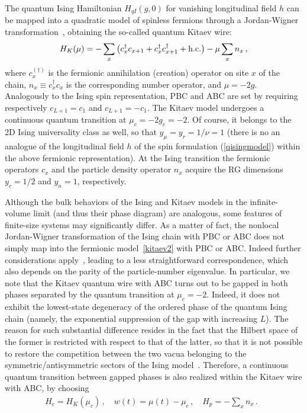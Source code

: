 The quantum Ising Hamiltonian $H_{qI}(g,0)$ for vanishing longitudinal
field $h$ can be mapped into a quadratic model of spinless fermions
through a Jordan-Wigner transformation~\cite{LSM-61, Katsura-62},
obtaining the so-called quantum Kitaev wire:~\cite{Kitaev-2001}
\begin{equation}
  H_{K}(\mu) = - \sum_{x} \big( c_x^\dagger c_{x+1} + c_x^\dagger
  c_{x+1}^\dagger + {\rm h.c.}  \big) - \mu \sum_{x} n_x \,,
  \label{kitaev2}
\end{equation}
where $c_x^{(\dagger)}$ is the fermionic annihilation (creation)
operator on site $x$ of the chain, $n_x\equiv c_x^\dagger c_x$ is the
corresponding number operator, and $\mu=-2g$.  Analogously to the
Ising spin representation, PBC and ABC are set by requiring
respectively $c_{L+1} = c_1$ and $c_{L+1} = -c_1$.  The Kitaev model
undergoes a continuous quantum transition at $\mu_c = -2g_c = -2$.  Of
course, it belongs to the 2D Ising universality class as well, so that
$y_\mu= y_r = 1/\nu=1$ (there is no an analogue of the longitudinal
field $h$ of the spin formulation (\ref{qisingmodel}) within the above
fermionic representation).  At the Ising transition the fermionic
operators $c_x$ and the particle density operator $n_x$ acquire the RG
dimensions $y_c=1/2$ and $y_n=1$, respectively.


Although the bulk behaviors of the Ising and Kitaev models in the
infinite-volume limit (and thus their phase diagram) are analogous,
some features of finite-size systems may significantly differ.  As a
matter of fact, the nonlocal Jordan-Wigner transformation of the Ising
chain with PBC or ABC does not simply map into the fermionic
model~\eqref{kitaev2} with PBC or ABC.  Indeed further considerations
apply~\cite{Katsura-62, PF70}, leading to a less straightforward
correspondence, which also depends on the parity of the
particle-number eigenvalue. In particular, we note that the Kitaev
quantum wire with ABC turns out to be gapped in both phases separated
by the quantum transition at $\mu_c=-2$. Indeed, it does not exhibit
the lowest-state degeneracy of the ordered phase of the quantum Ising
chain (namely, the exponential suppression of the gap with increasing
$L$).  The reason for such substantial difference resides in the fact
that the Hilbert space of the former is restricted with respect to
that of the latter, so that it is not possible to restore the
competition between the two vacua belonging to the
symmetric/antisymmetric sectors of the Ising model~\cite{Katsura-62,
  Kitaev-2001, CV2014, rossini2021coherent}.  Therefore, a continuous quantum
transition between gapped phases is also realized within the Kitaev
wire with ABC, by choosing
\begin{eqnarray}
  H_c = H_K(\mu_c)\,,\quad w(t) = \mu(t)-\mu_c\,,
  \quad H_p = - \sum_{x} n_x\,.\;\;
\label{kitchoice}
\end{eqnarray}


